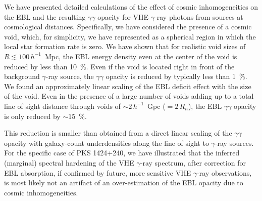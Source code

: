 \documentclass{aastex6}
\begin{document}
We have presented detailed calculations of the effect of cosmic inhomogeneities on the EBL and the
resulting $\gamma\gamma$ opacity for VHE $\gamma$-ray photons from sources at cosmological distances.
Specifically, we have considered the presence of a cosmic void, which, for simplicity, we have 
represented as a spherical region in which the local star formation rate is zero. We have shown 
that for realistic void sizes of $R \lesssim 100 \, h^{-1}$~Mpc, the EBL energy density even at
the center of the void is reduced by less than 10~\%. Even if the void is located right in front
of the background $\gamma$-ray source, the $\gamma\gamma$ opacity is reduced by typically less 
than 1~\%.  We found an approximately linear scaling of the EBL deficit effect with the size of the void.
Even in the presence of a large number of voids adding up to a total line of sight distance through 
voids of $\sim 2 \, h^{-1}$~Gpc ($= 2 \, R_n$), the EBL $\gamma\gamma$ opacity is only reduced 
by $\sim 15$~\%.

This reduction is smaller than obtained from a direct linear scaling of the $\gamma\gamma$
opacity with galaxy-count underdensities along the line of sight to $\gamma$-ray sources. For the 
specific case of PKS 1424+240, we have illustrated that the inferred (marginal) spectral hardening 
of the VHE $\gamma$-ray spectrum, after correction for EBL absorption, 
if confirmed by future, more sensitive VHE $\gamma$-ray observations,
is most likely not an artifact of an over-estimation of the EBL opacity due to cosmic inhomogeneities. 
\end{document}
